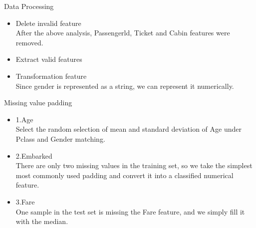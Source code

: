 \documentclass[
size=14pt,
paper=smartboard,  %
mode=present, 		%
display=slides, 	%
style=tuliplab,  	%
pauseslide,
fleqn,leqno]{powerdot}
\begin{document}
	\begin{slide}{Data Processing}
		
		\begin{center}
			\begin{itemize}
				
				\item
				\smallskip
				\large
				{Delete invalid feature\\
					After the above analysis, Passengerld, Ticket and Cabin features were removed.\\
				}
				\item
				\smallskip
				\large
				{Extract valid features\\
				}
				\item
				\smallskip
				\large
				{Transformation feature\\
					Since gender is represented as a string, we can represent it numerically.\\
				}
				
			\end{itemize}
		\end{center}
		
	\end{slide}
	
	
	
	\begin{slide}{Missing value padding}
		
		\begin{center}
			\begin{itemize}
				
				\item
				\smallskip
				\large
				{1.Age\\
					Select the random selection of mean and standard deviation of Age under Pclass and Gender matching.\\
				}
				\item
				\smallskip
				\large
				{2.Embarked\\
					There are only two missing values in the training set, so we take the simplest most commonly used padding and convert it into a classified numerical feature.\\
				}
				\item
				\smallskip
				\large
				{3.Fare\\
					One sample in the test set is missing the Fare feature, and we simply fill it with the median.\\
				}
				
			\end{itemize}
		\end{center}
		
	\end{slide}
	
\end{document}
